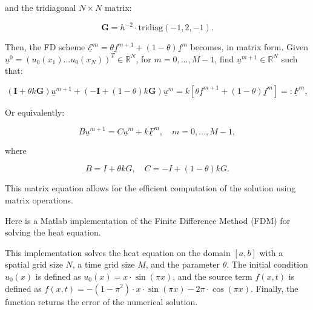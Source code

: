and the tridiagonal $N \times N$ matrix:

\[
\textbf{G} = h^{-2} \cdot \text{tridiag}(-1, 2, -1).
\]

Then, the FD scheme $\underline{\mathcal{E}}^{m} = \theta \underline{f}^{m+1} + (1 - \theta) \underline{f}^{m}$ becomes, in matrix form. Given $\underline{u}^{0} = (u_{0}(x_{1}) \hdots u_{0}(x_{N}))^T  \in \mathbb{R}^{N}$, for $m = 0, \ldots, M-1$, find $\underline{u}^{m+1} \in \mathbb{R}^{N}$ such that:

\[
(\textbf{I} + \theta k \textbf{G}) \underline{u}^{m+1} + (-\textbf{I} + (1 - \theta) k \textbf{G}) \underline{u}^{m} = k [\theta \underline{f}^{m+1} + (1 - \theta) \underline{f}^{m}] =: \underline{F}^{m},
\]

Or equivalently:

\[
B \underline{u}^{m+1} = C \underline{u}^{m} + k \underline{F}^{m}, \quad m = 0, \ldots, M-1,
\]

where

\[
B = I + \theta kG, \quad C = -I + (1 - \theta) kG.
\]

This matrix equation allows for the efficient computation of the solution using matrix operations.


Here is a Matlab implementation of the Finite Difference Method (FDM) for solving the heat equation.

This implementation solves the heat equation on the domain $[a, b]$ with a spatial grid size $N$, a time grid size $M$, and the parameter $\theta$. The initial condition $u_0(x)$ is defined as $u_0(x) = x \cdot \sin(\pi x)$, and the source term $f(x, t)$ is defined as $f(x, t) = -(1-\pi^2) \cdot x \cdot \sin(\pi x) - 2\pi \cdot \cos(\pi x)$. Finally, the function returns the error of the numerical solution.

\newpage



